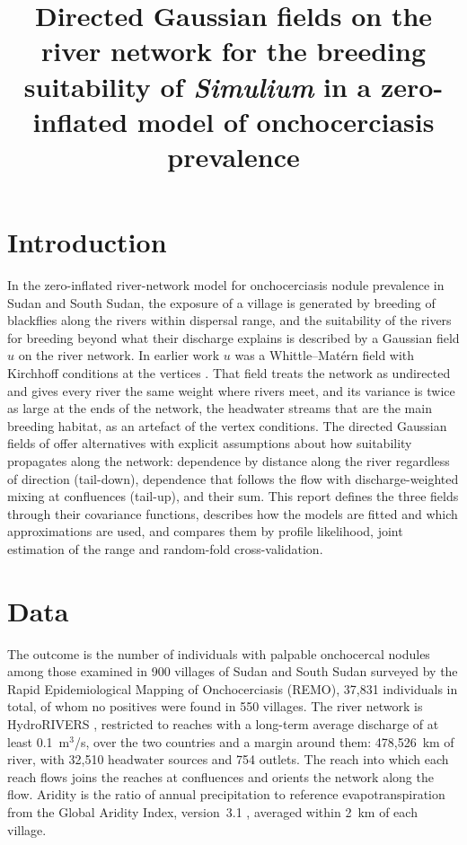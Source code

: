 \documentclass[11pt,a4paper]{article}
\title{Directed Gaussian fields on the river network for the breeding suitability of \textit{Simulium} in a zero-inflated model of onchocerciasis prevalence}
\author{}
\date{}
\begin{document}
\maketitle

\section{Introduction}

In the zero-inflated river-network model for onchocerciasis nodule prevalence in Sudan and South Sudan, the exposure of a village is generated by breeding of blackflies along the rivers within dispersal range, and the suitability of the rivers for breeding beyond what their discharge explains is described by a Gaussian field $u$ on the river network. In earlier work $u$ was a Whittle--Mat\'ern field with Kirchhoff conditions at the vertices \citep{bolin2024}. That field treats the network as undirected and gives every river the same weight where rivers meet, and its variance is twice as large at the ends of the network, the headwater streams that are the main breeding habitat, as an artefact of the vertex conditions. The directed Gaussian fields of \citet{bolin2026dir} offer alternatives with explicit assumptions about how suitability propagates along the network: dependence by distance along the river regardless of direction (tail-down), dependence that follows the flow with discharge-weighted mixing at confluences (tail-up), and their sum. This report defines the three fields through their covariance functions, describes how the models are fitted and which approximations are used, and compares them by profile likelihood, joint estimation of the range and random-fold cross-validation.

\section{Data}

The outcome is the number of individuals with palpable onchocercal nodules among those examined in 900 villages of Sudan and South Sudan surveyed by the Rapid Epidemiological Mapping of Onchocerciasis (REMO), 37{,}831 individuals in total, of whom no positives were found in 550 villages. The river network is HydroRIVERS \citep{lehner2013}, restricted to reaches with a long-term average discharge of at least 0.1~m$^3$/s, over the two countries and a margin around them: 478{,}526~km of river, with 32{,}510 headwater sources and 754 outlets. The reach into which each reach flows joins the reaches at confluences and orients the network along the flow. Aridity is the ratio of annual precipitation to reference evapotranspiration from the Global Aridity Index, version~3.1 \citep{zomer2022}, averaged within 2~km of each village.
\end{document}
